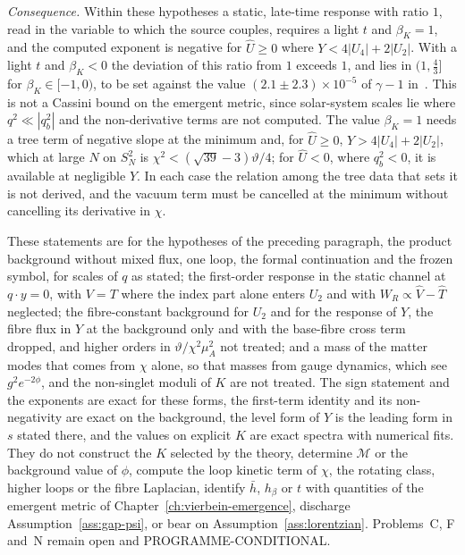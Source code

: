 \emph{Consequence.} Within these hypotheses a static, late-time response with ratio \(1\), read in the variable to which the source couples, requires a light \(t\) and \(\beta_K=1\), and the computed exponent is negative for \(\hat U\ge0\) where \(Y<4|U_4|+2|U_2|\). With a light \(t\) and \(\beta_K<0\) the deviation of this ratio from \(1\) exceeds \(1\), and lies in \((1,\tfrac43]\) for \(\beta_K\in[-1,0)\), to be set against the value \((2.1\pm2.3)\times10^{-5}\) of \(\gamma-1\) in~\cite{Bertotti2003}. This is not a Cassini bound on the emergent metric, since solar-system scales lie where \(q^2\ll|q_b^2|\) and the non-derivative terms are not computed. The value \(\beta_K=1\) needs a tree term of negative slope at the minimum and, for \(\hat U\ge0\), \(Y>4|U_4|+2|U_2|\), which at large \(N\) on \(S^2_N\) is \(\chi^2<(\sqrt{39}-3)\vartheta/4\); for \(\hat U<0\), where \(q_b^2<0\), it is available at negligible \(Y\). In each case the relation among the tree data that sets it is not derived, and the vacuum term must be cancelled at the minimum without cancelling its derivative in \(\chi\).

These statements are for the hypotheses of the preceding paragraph, the product background without mixed flux, one loop, the formal continuation and the frozen symbol, for scales of \(q\) as stated; the first-order response in the static channel at \(q\cdot y=0\), with \(V=T\) where the index part alone enters \(U_2\) and with \(W_R\propto\hat V-\hat T\) neglected; the fibre-constant background for \(U_2\) and for the response of \(Y\), the fibre flux in \(Y\) at the background only and with the base-fibre cross term dropped, and higher orders in \(\vartheta/\chi^2\mu_A^2\) not treated; and a mass of the matter modes that comes from \(\chi\) alone, so that masses from gauge dynamics, which see \(g^2e^{-2\phi}\), and the non-singlet moduli of \(K\) are not treated. The sign statement and the exponents are exact for these forms, the first-term identity and its non-negativity are exact on the background, the level form of \(Y\) is the leading form in \(s\) stated there, and the values on explicit \(K\) are exact spectra with numerical fits. They do not construct the \(K\) selected by the theory, determine \(\mathcal M\) or the background value of \(\phi\), compute the loop kinetic term of \(\chi\), the rotating class, higher loops or the fibre Laplacian, identify \(\bar h\), \(h_\beta\) or \(t\) with quantities of the emergent metric of Chapter~\ref{ch:vierbein-emergence}, discharge Assumption~\ref{ass:gap-psi}, or bear on Assumption~\ref{ass:lorentzian}. Problems~C, F and~N remain open and PROGRAMME-CONDITIONAL.

